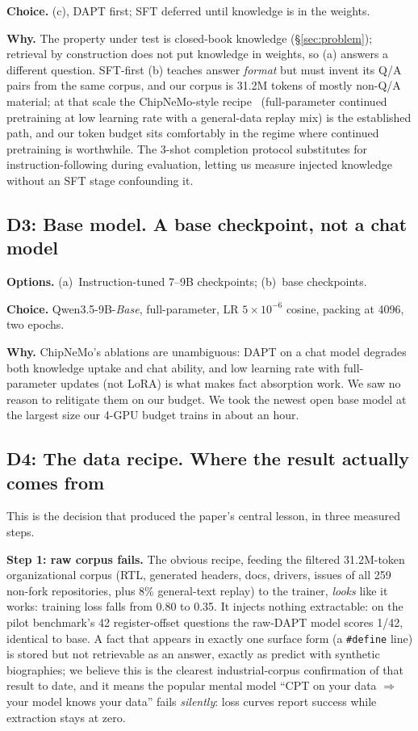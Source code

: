 \textbf{Choice.} (c), DAPT first; SFT deferred until knowledge is in the
weights.

\textbf{Why.} The property under test is closed-book knowledge
(\S\ref{sec:problem}); retrieval by construction does not put knowledge in
weights, so (a) answers a different question. SFT-first (b) teaches answer
\emph{format} but must invent its Q/A pairs from the same corpus, and our
corpus is 31.2M tokens of mostly non-Q/A material; at that scale the
ChipNeMo-style recipe~\citep{liu2023chipnemo} (full-parameter continued
pretraining at low learning rate with a general-data replay mix) is the
established path, and our token budget sits comfortably in the regime where
continued pretraining is worthwhile. The 3-shot completion protocol
substitutes for instruction-following during evaluation, letting us measure
injected knowledge without an SFT stage confounding it.

\subsection{D3: Base model. A base checkpoint, not a chat model}
\label{sec:d3}

\textbf{Options.} (a)~Instruction-tuned 7--9B checkpoints; (b)~base
checkpoints.

\textbf{Choice.} Qwen3.5-9B-\emph{Base}, full-parameter, LR $5\times10^{-6}$
cosine, packing at 4096, two epochs.

\textbf{Why.} ChipNeMo's ablations are unambiguous: DAPT on a chat model
degrades both knowledge uptake and chat ability, and low learning rate with
full-parameter updates (not LoRA) is what makes fact absorption work. We
saw no reason to relitigate them on our budget. We took the newest open base
model at the largest size our 4-GPU budget trains in about an hour.

\subsection{D4: The data recipe. Where the result actually comes from}
\label{sec:d4}

This is the decision that produced the paper's central lesson, in three
measured steps.

\textbf{Step 1: raw corpus fails.} The obvious recipe, feeding the filtered
31.2M-token organizational corpus (RTL, generated headers, docs, drivers,
issues of all 259 non-fork repositories, plus 8\% general-text replay) to the
trainer, \emph{looks} like it works: training loss falls from 0.80 to 0.35.
It injects nothing extractable: on the pilot benchmark's 42 register-offset
questions the raw-DAPT model scores 1/42, identical to base. A fact that
appears in exactly one surface form (a \texttt{\#define} line) is stored but
not retrievable as an answer, exactly as \citet{allenzhu2023physics31} predict
with synthetic biographies; we believe this is the clearest industrial-corpus
confirmation of that result to date, and it means the popular mental model
``CPT on your data $\Rightarrow$ your model knows your data'' fails
\emph{silently}: loss curves report success while extraction stays at zero.

